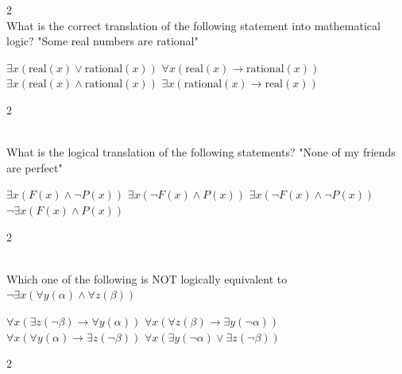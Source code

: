 \documentclass[12pt]{exam}
\begin{document}
\begin{questions}
\begin{multicols*}{2}
 \\[0.2cm]
{\Large What is the correct translation of the following statement into mathematical logic?\newline
"Some real numbers are rational"}
\begin{choices}
  \choice $\exists x (\text{real} (x) \vee \text{rational} (x))$
  \choice $\forall x (\text{real} (x) \rightarrow \text{rational} (x))$
  \choice $\exists x (\text{real} (x) \wedge \text{rational} (x))$
  \choice $\exists x (\text{rational} (x) \rightarrow \text{real} (x))$
\end{choices}

\end{multicols*}
\vspace{0.6cm}
\newpage
\begin{multicols*}{2}

 \\[0.2cm]
{\Large What is the logical translation of the following statements?\newline
"None of my friends are perfect"}
\begin{choices}
  \choice $\exists x (F(x) \wedge \neg P(x))$
  \choice $\exists x (\neg F(x) \wedge P(x))$
  \choice $\exists x (\neg F(x) \wedge \neg P(x))$
  \choice $\neg \exists x (F(x) \wedge P(x))$
\end{choices}

\end{multicols*}
\vspace{0.6cm}
\newpage
\begin{multicols*}{2}

 \\[0.2cm]
{\Large Which one of the following is NOT logically equivalent to $\neg \exists x(\forall y(\alpha) \wedge \forall z(\beta))$}
\begin{choices}
  \choice $\forall x(\exists z(\neg \beta) \rightarrow \forall y(\alpha))$
  \choice $\forall x(\forall z(\beta) \rightarrow \exists y(\neg \alpha))$
  \choice $\forall x(\forall y(\alpha) \rightarrow \exists z(\neg \beta))$
  \choice $\forall x(\exists y(\neg \alpha) \vee \exists z(\neg \beta))$
\end{choices}

\end{multicols*}
\vspace{0.6cm}
\newpage
\begin{multicols*}{2}


\end{multicols*}
\end{questions}
\end{document}
